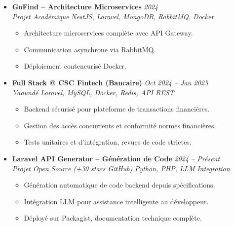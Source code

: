 \documentclass[a4paper,11pt]{article}
\begin{document}
\begin{itemize}[leftmargin=*, label={-}]
\item \textbf{GoFind -- Architecture Microservices} \hfill \textit{2024} \\
\textit{Projet Académique} \hfill \textit{NestJS, Laravel, MongoDB, RabbitMQ, Docker}
\vspace{-2pt}
    \begin{itemize}[leftmargin=0.4cm, nosep, label=\tiny$\bullet$]
        \item \small{Architecture microservices complète avec API Gateway.}
        \item \small{Communication asynchrone via RabbitMQ.}
        \item \small{Déploiement conteneurisé Docker.}
    \end{itemize}
\vspace{3pt}

\item \textbf{Full Stack @ CSC Fintech (Bancaire)} \hfill \textit{Oct 2024 -- Jan 2025} \\
\textit{Yaoundé} \hfill \textit{Laravel, MySQL, Docker, Redis, API REST}
\vspace{-2pt}
    \begin{itemize}[leftmargin=0.4cm, nosep, label=\tiny$\bullet$]
        \item \small{Backend sécurisé pour plateforme de transactions financières.}
        \item \small{Gestion des accès concurrents et conformité normes financières.}
        \item \small{Tests unitaires et d'intégration, revues de code strictes.}
    \end{itemize}
\vspace{3pt}

\item \textbf{Laravel API Generator -- Génération de Code} \hfill \textit{2024 -- Présent} \\
\textit{Projet Open Source (+30 stars GitHub)} \hfill \textit{Python, PHP, LLM Integration}
\vspace{-2pt}
    \begin{itemize}[leftmargin=0.4cm, nosep, label=\tiny$\bullet$]
        \item \small{Génération automatique de code backend depuis spécifications.}
        \item \small{Intégration LLM pour assistance intelligente au développeur.}
        \item \small{Déployé sur Packagist, documentation technique complète.}
    \end{itemize}
\vspace{3pt}


\end{itemize}
\end{document}
